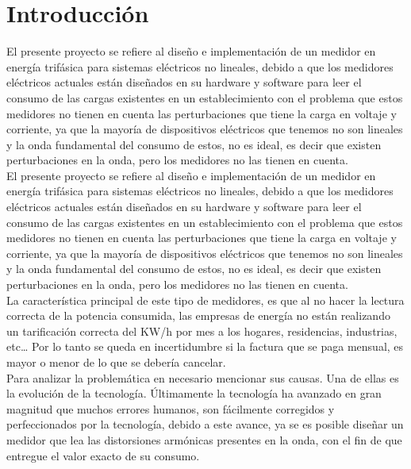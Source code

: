 \setcounter{page}{1}


\newpage{\cleardoublepage}
\chapter{Introducción}

El presente proyecto se refiere al diseño e implementación de un medidor en energía trifásica para sistemas eléctricos no lineales, debido a que los medidores eléctricos actuales están diseñados en su hardware y software para leer el consumo de las cargas existentes en un establecimiento con el problema que estos medidores no tienen en cuenta las perturbaciones que tiene la carga en voltaje y corriente, ya que la mayoría de dispositivos eléctricos que tenemos no son lineales y la onda fundamental del consumo de estos, no es ideal, es decir que existen perturbaciones en la onda, pero los medidores no las tienen en cuenta.\\



El presente proyecto se refiere al diseño e implementación de un medidor en energía trifásica para sistemas eléctricos no lineales, debido a que los medidores eléctricos actuales están diseñados en su hardware y software para leer el consumo de las cargas existentes en un establecimiento con el problema que estos medidores no tienen en cuenta las perturbaciones que tiene la carga en voltaje y corriente, ya que la mayoría de dispositivos eléctricos que tenemos no son lineales y la onda fundamental del consumo de estos, no es ideal, es decir que existen perturbaciones en la onda, pero los medidores no las tienen en cuenta. \\

La característica principal de este tipo de medidores, es que al no hacer la lectura correcta de la potencia consumida, las empresas de energía no están realizando un tarificación correcta del KW/h por mes a los hogares, residencias, industrias, etc… Por lo tanto se queda en incertidumbre si la factura que se paga mensual, es mayor o menor de lo que se debería cancelar.\\

Para analizar la problemática en necesario mencionar sus causas. Una de ellas es la evolución de la tecnología. Últimamente la tecnología ha avanzado en gran magnitud que muchos errores humanos, son fácilmente corregidos y perfeccionados por la tecnología, debido a este avance, ya se es posible diseñar un medidor que lea las distorsiones armónicas presentes en la onda, con el fin de que entregue el valor exacto de su consumo.\\

